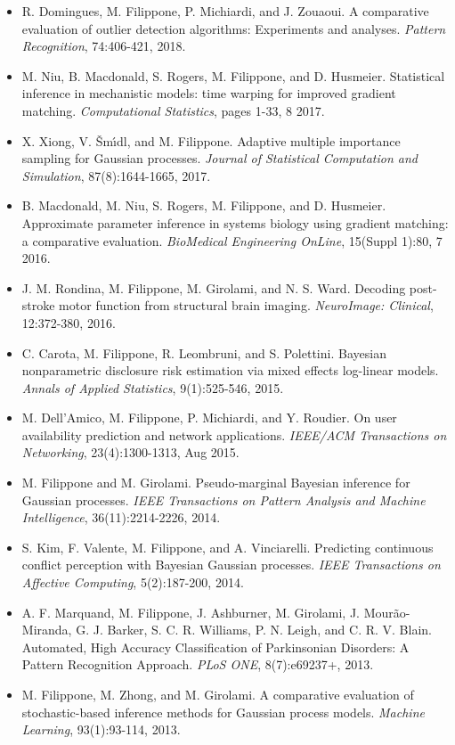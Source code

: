 \begin{itemize}
\item  R. Domingues, M. Filippone, P. Michiardi, and J. Zouaoui. A comparative evaluation of outlier detection algorithms: Experiments and analyses. \emph{Pattern Recognition}, 74:406-421, 2018.  
\item  M. Niu, B. Macdonald, S. Rogers, M. Filippone, and D. Husmeier. Statistical inference in mechanistic models: time warping for improved gradient matching. \emph{Computational Statistics}, pages 1-33, 8 2017.  
\item  X. Xiong, V. Šm\'{\i}dl, and M. Filippone. Adaptive multiple importance sampling for Gaussian processes. \emph{Journal of Statistical Computation and Simulation}, 87(8):1644-1665, 2017.  
\item  B. Macdonald, M. Niu, S. Rogers, M. Filippone, and D. Husmeier. Approximate parameter inference in systems biology using gradient matching: a comparative evaluation. \emph{BioMedical Engineering OnLine}, 15(Suppl 1):80, 7 2016.  
\item  J. M. Rondina, M. Filippone, M. Girolami, and N. S. Ward. Decoding post-stroke motor function from structural brain imaging. \emph{NeuroImage: Clinical}, 12:372-380, 2016.  
\item  C. Carota, M. Filippone, R. Leombruni, and S. Polettini. Bayesian nonparametric disclosure risk estimation via mixed effects log-linear models. \emph{Annals of Applied Statistics}, 9(1):525-546, 2015.  
\item  M. Dell'Amico, M. Filippone, P. Michiardi, and Y. Roudier. On user availability prediction and network applications. \emph{IEEE/ACM Transactions on Networking}, 23(4):1300-1313, Aug 2015.  
\item  M. Filippone and M. Girolami. Pseudo-marginal Bayesian inference for Gaussian processes. \emph{IEEE Transactions on Pattern Analysis and Machine Intelligence}, 36(11):2214-2226, 2014.  
\item  S. Kim, F. Valente, M. Filippone, and A. Vinciarelli. Predicting continuous conflict perception with Bayesian Gaussian processes. \emph{IEEE Transactions on Affective Computing}, 5(2):187-200, 2014.  
\item  A. F. Marquand, M. Filippone, J. Ashburner, M. Girolami, J. Mour\~ao-Miranda, G. J. Barker, S. C. R. Williams, P. N. Leigh, and C. R. V. Blain. Automated, High Accuracy Classification of Parkinsonian Disorders: A Pattern Recognition Approach. \emph{PLoS ONE}, 8(7):e69237+, 2013.  
\item  M. Filippone, M. Zhong, and M. Girolami. A comparative evaluation of stochastic-based inference methods for Gaussian process models. \emph{Machine Learning}, 93(1):93-114, 2013.  

\end{itemize}

